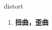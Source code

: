 
\begin{frame}
{\huge distort}
\begin{center}
\begin{enumerate}\Large
  \item \textbf{扭曲，歪曲}
\end{enumerate}
\end{center}
\end{frame}
